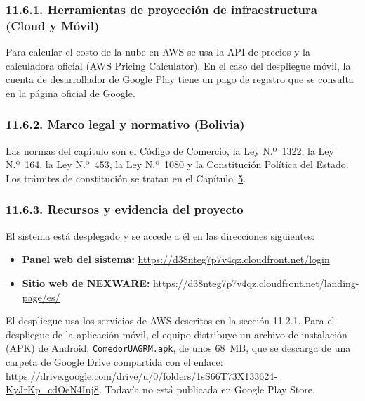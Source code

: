 \subsubsection{11.6.1. Herramientas de proyección de infraestructura (Cloud y Móvil)}

Para calcular el costo de la nube en AWS se usa la API de precios y la calculadora oficial (AWS Pricing Calculator). En el caso del despliegue móvil, la cuenta de desarrollador de Google Play tiene un pago de registro que se consulta en la página oficial de Google.

\subsubsection{11.6.2. Marco legal y normativo (Bolivia)}

Las normas del capítulo son el Código de Comercio, la Ley N.º~1322, la Ley N.º~164, la Ley N.º~453, la Ley N.º~1080 y la Constitución Política del Estado. Los trámites de constitución se tratan en el Capítulo~\hyperref[cap:legal]{5}.

\subsubsection{11.6.3. Recursos y evidencia del proyecto}

El sistema está desplegado y se accede a él en las direcciones siguientes:

\begin{itemize}
    \item \textbf{Panel web del sistema:} \url{https://d38nteg7p7v4qz.cloudfront.net/login}
    \item \textbf{Sitio web de NEXWARE:} \url{https://d38nteg7p7v4qz.cloudfront.net/landing-page/es/}
\end{itemize}

El despliegue usa los servicios de AWS descritos en la sección 11.2.1. Para el despliegue de la aplicación móvil, el equipo distribuye un archivo de instalación (APK) de Android, \texttt{ComedorUAGRM.apk}, de unos 68~MB, que se descarga de una carpeta de Google Drive compartida con el enlace: \url{https://drive.google.com/drive/u/0/folders/1sS66T73X133624-KyJrKp_cdOeN4Inj8}. Todavía no está publicada en Google Play Store.

